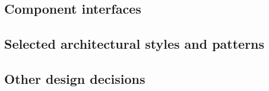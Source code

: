\subsection{Component interfaces}

\subsection{Selected architectural styles and patterns}
\subsection{Other design decisions}

